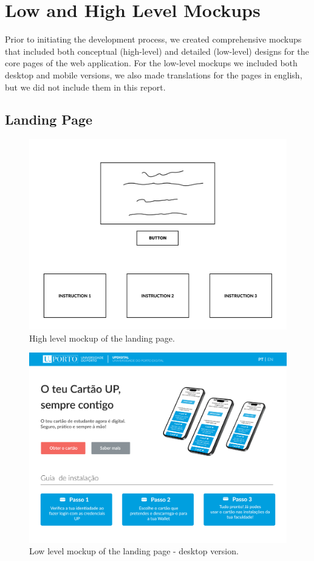 \documentclass[10pt]{article}
\begin{document}
\section{Low and High Level Mockups}

Prior to initiating the development process, we created comprehensive mockups that included both conceptual (high-level) and detailed (low-level) designs for the core pages of the web application. For the low-level mockups we included both desktop and mobile versions, we also made translations for the pages in english, but we did not include them in this report.

\subsection{Landing Page}

\begin{figure}[H]
  \centering
  \includegraphics[width=1\linewidth]{report-images/landing-page-high-level.png}
  \caption{High level mockup of the landing page.}
  \label{fig:fig-7}
\end{figure}

\begin{figure}[H]
  \centering
  \includegraphics[width=1\linewidth]{report-images/landing-page-desktop.png}
  \caption{Low level mockup of the landing page - desktop version.}
  \label{fig:fig-8}
\end{figure}
\end{document}

